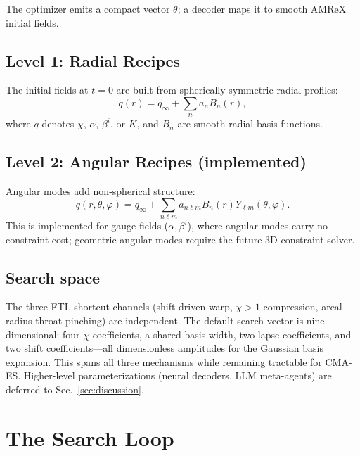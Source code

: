 \documentclass[twocolumn,floatfix,aps,prd,nofootinbib]{revtex4-2}
\begin{document}
The optimizer emits a compact vector $\theta$; a decoder maps it to smooth AMReX initial fields.

\subsection{Level 1: Radial Recipes}

The initial fields at $t=0$ are built from spherically symmetric radial profiles:
\begin{equation}
    q(r) = q_\infty + \sum_n a_n B_n(r),
\end{equation}
where $q$ denotes $\chi$, $\alpha$, $\beta^i$, or $K$, and $B_n$ are smooth radial basis functions.

\subsection{Level 2: Angular Recipes (implemented)}

Angular modes add non-spherical structure:
\begin{equation}
    q(r,\theta,\varphi) = q_\infty + \sum_{n\ell m} a_{n\ell m}B_n(r)Y_{\ell m}(\theta,\varphi).
\end{equation}
This is implemented for gauge fields ($\alpha,\beta^i$), where angular modes carry no constraint cost; geometric angular modes require the future 3D constraint solver.

\subsection{Search space}

The three FTL shortcut channels (shift-driven warp, $\chi>1$ compression, areal-radius throat pinching) are independent.  The default search vector is nine-dimensional: four $\chi$ coefficients, a shared basis width, two lapse coefficients, and two shift coefficients---all dimensionless amplitudes for the Gaussian basis expansion.  This spans all three mechanisms while remaining tractable for CMA-ES.  Higher-level parameterizations (neural decoders, LLM meta-agents) are deferred to Sec.~\ref{sec:discussion}.

\section{The Search Loop}
\label{sec:search_loop}
\end{document}
